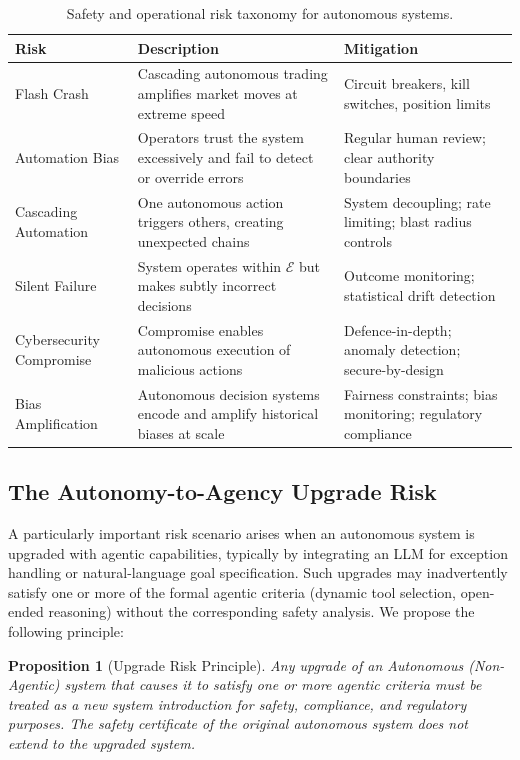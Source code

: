 \documentclass[12pt, a4paper]{article}
\newtheorem{proposition}{Proposition}
\begin{document}
\begin{table}[ht]
\centering
\caption{Safety and operational risk taxonomy for autonomous systems.}
\label{tab:risks}
\begin{tabular}{p{3cm}p{5cm}p{4.5cm}}
\toprule
\textbf{Risk} & \textbf{Description} & \textbf{Mitigation} \\
\midrule
Flash Crash & Cascading autonomous trading amplifies market moves at extreme speed & Circuit breakers, kill switches, position limits \\
Automation Bias & Operators trust the system excessively and fail to detect or override errors & Regular human review; clear authority boundaries \\
Cascading Automation & One autonomous action triggers others, creating unexpected chains & System decoupling; rate limiting; blast radius controls \\
Silent Failure & System operates within $\mathcal{E}$ but makes subtly incorrect decisions & Outcome monitoring; statistical drift detection \\
Cybersecurity Compromise & Compromise enables autonomous execution of malicious actions & Defence-in-depth; anomaly detection; secure-by-design \\
Bias Amplification & Autonomous decision systems encode and amplify historical biases at scale & Fairness constraints; bias monitoring; regulatory compliance \\
\bottomrule
\end{tabular}
\end{table}

\subsection{The Autonomy-to-Agency Upgrade Risk}
A particularly important risk scenario arises when an autonomous system is upgraded with agentic capabilities, typically by integrating an LLM for exception handling or natural-language goal specification. Such upgrades may inadvertently satisfy one or more of the formal agentic criteria (dynamic tool selection, open-ended reasoning) without the corresponding safety analysis. We propose the following principle:

\begin{proposition}[Upgrade Risk Principle]
Any upgrade of an Autonomous (Non-Agentic) system that causes it to satisfy one or more agentic criteria must be treated as a new system introduction for safety, compliance, and regulatory purposes. The safety certificate of the original autonomous system does not extend to the upgraded system.
\end{proposition}
\end{document}

